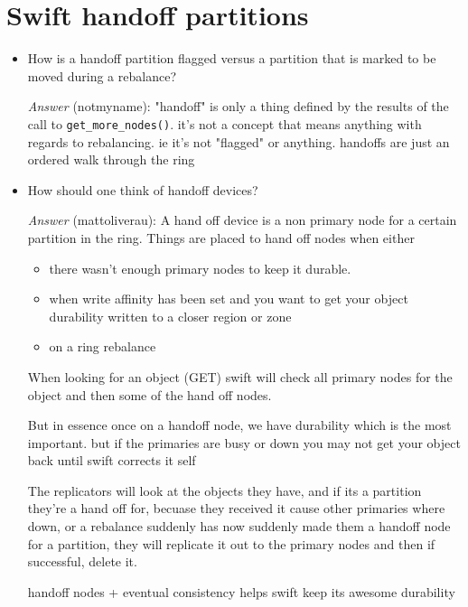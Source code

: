 \documentclass{article}
\begin{document}
\section{Swift handoff partitions}
\label{sec:org3a671e1}
\begin{itemize}
\item How is a handoff partition flagged versus a partition that is
marked to be moved during a rebalance?

    \emph{Answer} (notmyname): "handoff" is only a thing defined by the
results of the call to \texttt{get\_more\_nodes()}. it's not a concept
that means anything with regards to rebalancing. ie it's not
"flagged" or anything. handoffs are just an ordered walk through
the ring
\end{itemize}


\begin{itemize}
\item How should one think of handoff devices?

\emph{Answer} (mattoliverau): A hand off device is a non primary node
for a certain partition in the ring. Things are placed to hand
off nodes when either

\begin{itemize}
\item there wasn't enough primary nodes to keep it durable.
\end{itemize}
\begin{itemize}
\item when write affinity has been set and you want to get your
object durability written to a closer region or zone
\item on a ring rebalance
\end{itemize}

When looking for an object (GET) swift will check all primary
nodes for the object and then some of the hand off nodes.

But in essence once on a handoff node, we have durability which
is the most important. but if the primaries are busy or down you
may not get your object back until swift corrects it self

The replicators will look at the objects they have, and if its a
partition they're a hand off for, becuase they received it cause
other primaries where down, or a rebalance suddenly has now
suddenly made them a handoff node for a partition, they will
replicate it out to the primary nodes and then if successful,
delete it.

handoff nodes + eventual consistency helps swift keep its awesome
durability
\end{itemize}
\end{document}
